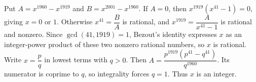 Put $A=x^{1960}-x^{1919}$ and $B=x^{2001}-x^{1960}$. If $A=0$, then $x^{1919}(x^{41}-1)=0$, giving $x=0$ or $1$. Otherwise $x^{41}=\dfrac{B}{A}$ is rational, and $x^{1919}=\dfrac{A}{x^{41}-1}$ is rational and nonzero. Since $\gcd(41,1919)=1$, Bezout's identity expresses $x$ as an integer-power product of these two nonzero rational numbers, so $x$ is rational. Write $x=\dfrac{p}{q}$ in lowest terms with $q>0$. Then $A=\dfrac{p^{1919}(p^{41}-q^{41})}{q^{1960}}$. Its numerator is coprime to $q$, so integrality forces $q=1$. Thus $x$ is an integer.
